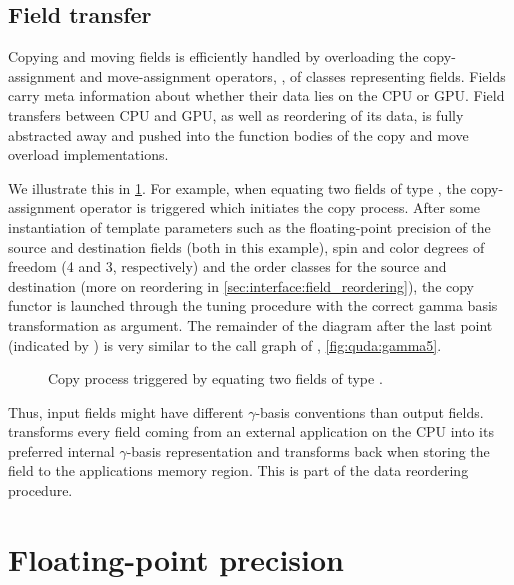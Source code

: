 \subsection{Field transfer}

Copying and moving fields is efficiently handled by overloading the copy-assignment and move-assignment operators, , of classes representing fields.
Fields carry meta information about whether their data lies on the CPU or GPU.
Field transfers between CPU and GPU, as well as reordering of its data, is fully abstracted away and pushed into the function bodies of the copy and move overload implementations.


We illustrate this in \cref{fig:quda:copy}.
For example, when equating two fields of type , the copy-assignment operator is triggered which initiates the copy process.
After some instantiation of template parameters such as the floating-point precision of the source  and destination  fields (both  in this example), spin and color degrees of freedom (\num{4} and \num{3}, respectively) and the order classes for the source and destination (more on reordering in \cref{sec:interface:field_reordering}), the copy functor  is launched through the tuning procedure with the correct gamma basis transformation as argument.
The remainder of the diagram after the last point (indicated by ) is very similar to the call graph of , \cref{fig:quda:gamma5}.
\begin{figure}
  
  \caption{Copy process triggered by equating two fields of type .}
  \label{fig:quda:copy}
\end{figure}

Thus, input fields might have different $\gamma$-basis conventions than output fields.
\Quda transforms every field coming from an external application on the CPU into its preferred internal $\gamma$-basis representation and transforms back when storing the field to the applications memory region.
This is part of the data reordering procedure.

\section{Floating-point precision}
\label{sec:quda:precision}

